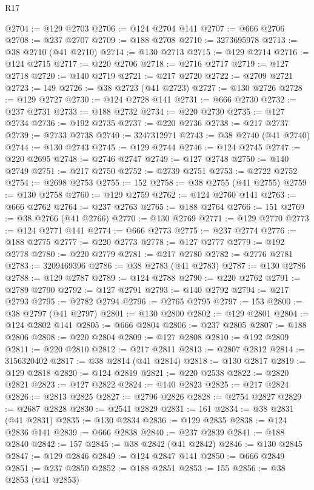 \begin{lexlean}{R17}
\begin{coremodule}
@2704 := @129 @2703
@2706 := @124 @2704 @141
@2707 := @666 @2706
@2708 := @237 @2707
@2709 := @188 @2708
@2710 := 3273695978
@2713 := @38 @2710 (@41 @2710)
@2714 := @130 @2713
@2715 := @129 @2714
@2716 := @124 @2715
@2717 := @220 @2706
@2718 := @2716 @2717
@2719 := @127 @2718
@2720 := @140 @2719
@2721 := @217 @2720
@2722 := @2709 @2721
@2723 := 149
@2726 := @38 @2723 (@41 @2723)
@2727 := @130 @2726
@2728 := @129 @2727
@2730 := @124 @2728 @141
@2731 := @666 @2730
@2732 := @237 @2731
@2733 := @188 @2732
@2734 := @220 @2730
@2735 := @127 @2734
@2736 := @192 @2735
@2737 := @220 @2736
@2738 := @217 @2737
@2739 := @2733 @2738
@2740 := 3247312971
@2743 := @38 @2740 (@41 @2740)
@2744 := @130 @2743
@2745 := @129 @2744
@2746 := @124 @2745
@2747 := @220 @2695
@2748 := @2746 @2747
@2749 := @127 @2748
@2750 := @140 @2749
@2751 := @217 @2750
@2752 := @2739 @2751
@2753 := @2722 @2752
@2754 := @2698 @2753
@2755 := 152
@2758 := @38 @2755 (@41 @2755)
@2759 := @130 @2758
@2760 := @129 @2759
@2762 := @124 @2760 @141
@2763 := @666 @2762
@2764 := @237 @2763
@2765 := @188 @2764
@2766 := 151
@2769 := @38 @2766 (@41 @2766)
@2770 := @130 @2769
@2771 := @129 @2770
@2773 := @124 @2771 @141
@2774 := @666 @2773
@2775 := @237 @2774
@2776 := @188 @2775
@2777 := @220 @2773
@2778 := @127 @2777
@2779 := @192 @2778
@2780 := @220 @2779
@2781 := @217 @2780
@2782 := @2776 @2781
@2783 := 3209469396
@2786 := @38 @2783 (@41 @2783)
@2787 := @130 @2786
@2788 := @129 @2787
@2789 := @124 @2788
@2790 := @220 @2762
@2791 := @2789 @2790
@2792 := @127 @2791
@2793 := @140 @2792
@2794 := @217 @2793
@2795 := @2782 @2794
@2796 := @2765 @2795
@2797 := 153
@2800 := @38 @2797 (@41 @2797)
@2801 := @130 @2800
@2802 := @129 @2801
@2804 := @124 @2802 @141
@2805 := @666 @2804
@2806 := @237 @2805
@2807 := @188 @2806
@2808 := @220 @2804
@2809 := @127 @2808
@2810 := @192 @2809
@2811 := @220 @2810
@2812 := @217 @2811
@2813 := @2807 @2812
@2814 := 3156320402
@2817 := @38 @2814 (@41 @2814)
@2818 := @130 @2817
@2819 := @129 @2818
@2820 := @124 @2819
@2821 := @220 @2538
@2822 := @2820 @2821
@2823 := @127 @2822
@2824 := @140 @2823
@2825 := @217 @2824
@2826 := @2813 @2825
@2827 := @2796 @2826
@2828 := @2754 @2827
@2829 := @2687 @2828
@2830 := @2541 @2829
@2831 := 161
@2834 := @38 @2831 (@41 @2831)
@2835 := @130 @2834
@2836 := @129 @2835
@2838 := @124 @2836 @141
@2839 := @666 @2838
@2840 := @237 @2839
@2841 := @188 @2840
@2842 := 157
@2845 := @38 @2842 (@41 @2842)
@2846 := @130 @2845
@2847 := @129 @2846
@2849 := @124 @2847 @141
@2850 := @666 @2849
@2851 := @237 @2850
@2852 := @188 @2851
@2853 := 155
@2856 := @38 @2853 (@41 @2853)

\end{coremodule}
\end{lexlean}
